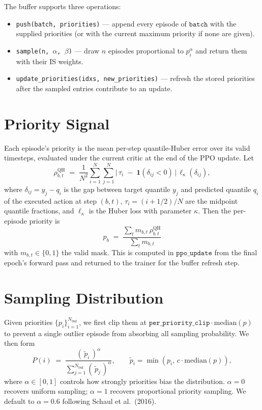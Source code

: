\documentclass[11pt]{article}
\newcommand{\indicator}{\mathbf{1}}
\begin{document}
The buffer supports three operations:
\begin{itemize}
  \item \texttt{push(batch, priorities)} — append every episode of
        $\texttt{batch}$ with the supplied priorities (or with the
        current maximum priority if none are given).
  \item \texttt{sample(n, $\alpha$, $\beta$)} — draw $n$ episodes
        proportional to $p_i^{\alpha}$ and return them with their
        IS weights.
  \item \texttt{update\_priorities(idxs, new\_priorities)} — refresh
        the stored priorities after the sampled entries contribute to
        an update.
\end{itemize}

\section{Priority Signal}

Each episode's priority is the mean per-step quantile-Huber error
over its valid timesteps, evaluated under the current critic at the
end of the PPO update. Let
\begin{equation}
\rho^{\text{QH}}_{b,t} \;=\;
\frac{1}{N^2} \sum_{i=1}^{N}\sum_{j=1}^{N}
\bigl|\,\tau_i \;-\; \indicator(\delta_{ij} < 0)\,\bigr| \,
\ell_{\kappa}(\delta_{ij}),
\end{equation}
where $\delta_{ij} = y_j - q_i$ is the gap between target quantile
$y_j$ and predicted quantile $q_i$ of the executed action at step
$(b,t)$, $\tau_i = (i + 1/2)/N$ are the midpoint quantile fractions,
and $\ell_{\kappa}$ is the Huber loss with parameter $\kappa$. Then
the per-episode priority is
\begin{equation}
\boxed{ \;
p_b \;=\;
\frac{\sum_{t} m_{b,t}\, \rho^{\text{QH}}_{b,t}}{\sum_{t} m_{b,t}}
\;}
\label{eq:priority}
\end{equation}
with $m_{b,t} \in \{0,1\}$ the valid mask. This is computed in
$\texttt{ppo\_update}$ from the final epoch's forward pass and returned
to the trainer for the buffer refresh step.

\section{Sampling Distribution}

Given priorities $\{p_i\}_{i=1}^{N_{\text{buf}}}$, we first clip them
at $\texttt{per\_priority\_clip}\cdot \mathrm{median}(p)$ to prevent a
single outlier episode from absorbing all sampling probability. We
then form
\begin{equation}
P(i) \;=\; \frac{ (\,\tilde p_i\,)^{\alpha} }{\sum_{j=1}^{N_{\text{buf}}} (\,\tilde p_j\,)^{\alpha} },
\qquad \tilde p_i = \min(p_i,\, c\cdot \mathrm{median}(p)),
\label{eq:sampling}
\end{equation}
where $\alpha \in [0,1]$ controls how strongly priorities bias the
distribution. $\alpha = 0$ recovers uniform sampling; $\alpha = 1$
recovers proportional priority sampling. We default to
$\alpha = 0.6$ following Schaul et al.~(2016).
\end{document}
